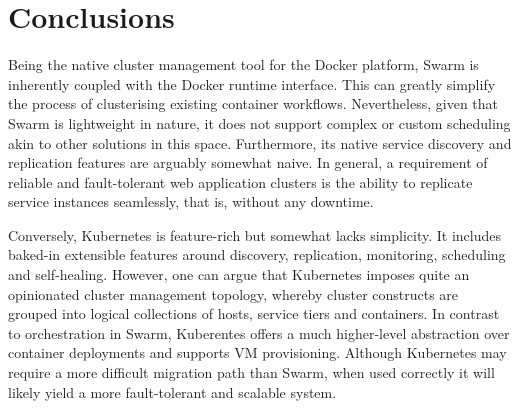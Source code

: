 \documentclass{article}
\begin{document}
\section{Conclusions}
Being the native cluster management tool for the Docker platform, Swarm is inherently coupled with the Docker runtime interface. This can greatly simplify the process of clusterising existing container workflows. Nevertheless, given that Swarm is lightweight in nature, it does not support complex or custom scheduling akin to other solutions in this space. Furthermore, its native service discovery and replication features are arguably somewhat naive. In general, a requirement of reliable and fault-tolerant web application clusters is the ability to replicate service instances seamlessly, that is, without any downtime.
\par
Conversely, Kubernetes is feature-rich but somewhat lacks simplicity. It includes baked-in extensible features around discovery, replication, monitoring, scheduling and self-healing. However, one can argue that Kubernetes imposes quite an opinionated cluster management topology, whereby cluster constructs are grouped into logical collections of hosts, service tiers and containers. In contrast to orchestration in Swarm, Kuberentes offers a much higher-level abstraction over container deployments and supports VM provisioning. Although Kubernetes may require a more difficult migration path than Swarm, when used correctly it will likely yield a more fault-tolerant and scalable system.

\vspace{-7.5mm}
\renewcommand{\refname}{\section{References}}

\end{document}
